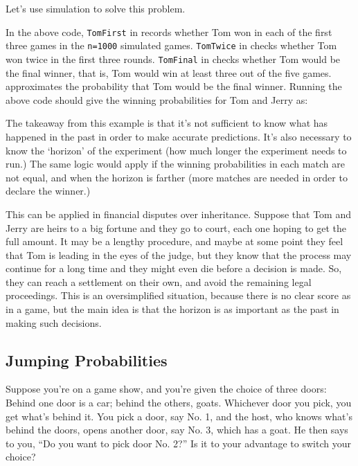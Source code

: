 Let's use simulation to solve this problem.


In the above code, \lstinline{TomFirst} in  records whether Tom won in
each of the first three games in the \lstinline{n=1000} simulated games.
\lstinline{TomTwice} in  checks whether Tom won twice in the first three
rounds.  \lstinline{TomFinal} in  checks whether Tom would be the final
winner, that is, Tom would win at least three out of the five games.  
approximates the probability that Tom would be the final winner.
Running the above code should give the winning probabilities for Tom and Jerry
as:

The takeaway from this example is that it's not sufficient to know what has
happened in the past in order to make accurate predictions. It's also necessary
to know the `horizon' of the experiment (how much longer the experiment needs to
run.) The same logic would apply if the winning probabilities in each match are
not equal, and when the horizon is farther (more matches are needed in order to
declare the winner.)

This can be applied in financial disputes over inheritance. Suppose that Tom and
Jerry are heirs to a big fortune and they go to court, each one hoping to get the
full amount. It may be a lengthy procedure, and maybe at some point they feel
that Tom is leading in the eyes of the judge, but they know that the process may
continue for a long time and they might even die before a decision is made. So,
they can reach a settlement on their own, and avoid the remaining legal
proceedings. This is an oversimplified situation, because there is no clear
score as in a game, but the main idea is that the horizon is as important as the
past in making such decisions.

\subsection{Jumping Probabilities}\label{sec:Monty-Hall-problem}

\begin{example}
Suppose you're on a game show, and you're given the choice of three doors:
Behind one door is a car; behind the others, goats. Whichever door you pick, you
get what's behind it.  You pick a door, say No. 1, and the host, who knows
what's behind the doors, opens another door, say No. 3, which has a goat. He
then says to you, ``Do you want to pick door No. 2?'' Is it to your advantage to
switch your choice?
\end{example}

